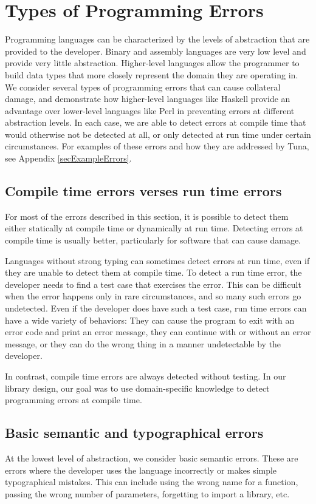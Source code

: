 \documentclass[figure,letterpaper,onefignum]{mysiam}
\begin{document}
\section{Types of Programming Errors}
Programming languages can be characterized by the levels of abstraction that are provided to the developer. Binary and assembly languages are very low level and provide very little abstraction. Higher-level languages allow the programmer to build data types that more closely represent the domain they are operating in. We consider several types of programming errors that can cause collateral damage, and demonstrate how higher-level languages like Haskell provide an advantage over lower-level languages like Perl in preventing errors at different abstraction levels.  In each case, we are able to detect errors at compile time that would otherwise not be detected at all, or only detected at run time under certain circumstances. For examples of these errors and how they are addressed by Tuna, see Appendix \ref{secExampleErrors}.

\subsection{Compile time errors verses run time errors}
For most of the errors described in this section, it is possible to detect them either statically at compile time or dynamically at run time. Detecting errors at compile time is usually better, particularly for software that can cause damage.

Languages without strong typing can sometimes detect errors at run time, even if they are unable to detect them at compile time. To detect a run time error, the developer needs to find a test case that exercises the error. This can be difficult when the error happens only in rare circumstances, and so many such errors go undetected. Even if the developer does have such a test case, run time errors can have a wide variety of behaviors: They can cause the program to exit with an error code and print an error message, they can continue with or without an error message, or they can do the wrong thing in a manner undetectable by the developer.

In contrast, compile time errors are always detected without testing. In our library design, our goal was to use domain-specific knowledge to detect programming errors at compile time.

\subsection{Basic semantic and typographical errors}
At the lowest level of abstraction, we consider basic semantic errors. These are errors where the developer uses the language incorrectly or makes simple typographical mistakes. This can include using the wrong name for a function, passing the wrong number of parameters, forgetting to import a library, etc.
\end{document}
